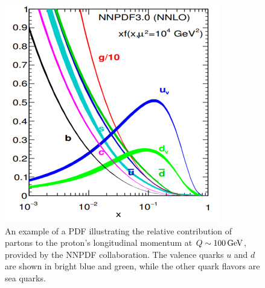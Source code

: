 \begin{figure}[htbp]
\centering
\includegraphics[width=0.6\linewidth]{plots/SM/PDFSET.PNG}
\caption{An example of a PDF illustrating the relative contribution of partons to the proton's longitudinal momentum at $Q\sim 100\,\text{Ge\hspace{-.08em}V}$, provided by the NNPDF collaboration\cite{Ball:2017nwa}. The valence quarks $u$ and $d$ are shown in bright blue and green, while the other quark flavors are sea quarks.}
\label{fig:sm:nnpdf}
\end{figure}